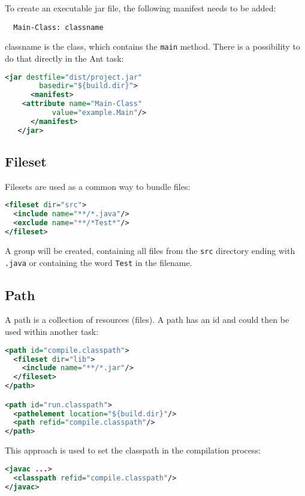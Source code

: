 \newslide
To create an executable jar file, the following manifest needs to be
added:
\begin{verbatim}
  Main-Class: classname
\end{verbatim}
classname is the class, which contains the \verb|main| method. There
is a possibility to do that directly in the Ant task:
\begin{lstlisting}[language=xml,morekeywords={jar,manifest,attribute}]
   <jar destfile="dist/project.jar"
        basedir="${build.dir}">
      <manifest>
	<attribute name="Main-Class"
		   value="example.Main"/>
      </manifest>
   </jar>
\end{lstlisting}
\newslide
\subsection{Fileset}
Filesets are used as a common way to bundle files:
\begin{lstlisting}[language=xml,morekeywords={fileset,include,exclude}]
<fileset dir="src">
  <include name="**/*.java"/>
  <exclude name="**/*Test*"/>
</fileset>
\end{lstlisting}
A group will be created, containing all files from the \verb|src| directory ending with \verb|.java|
or containing the word \verb|Test| in the filename.
%
\newslide
\subsection{Path}
A path is a collection of resources (files). A path has an id and could
then be used within another task:
\begin{lstlisting}[language=xml,morekeywords={path,pathelement,fileset,include}]
<path id="compile.classpath">
  <fileset dir="lib">
    <include name="**/*.jar"/>
  </fileset>
</path>

<path id="run.classpath">
  <pathelement location="${build.dir}"/>
  <path refid="compile.classpath"/>
</path>
\end{lstlisting}
\newslide
This approach is used to set the classpath in the compilation process:
\begin{lstlisting}[language=xml,morekeywords={javac,classpath}]
<javac ...>
  <classpath refid="compile.classpath"/>
</javac>
\end{lstlisting}
%
\newslide
